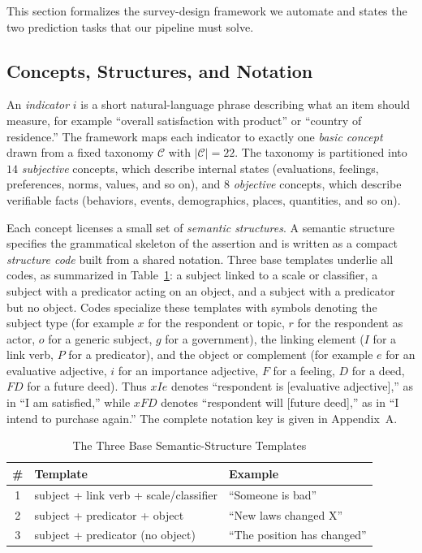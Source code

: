 \documentclass[onecolumn, 11pt]{IEEEtran}
\begin{document}
This section formalizes the survey-design framework we automate and states the two prediction tasks that our pipeline must solve.

\subsection{Concepts, Structures, and Notation}
An \emph{indicator} $i$ is a short natural-language phrase describing what an item should measure, for example ``overall satisfaction with product'' or ``country of residence.'' The framework maps each indicator to exactly one \emph{basic concept} drawn from a fixed taxonomy $\mathcal{C}$ with $|\mathcal{C}| = 22$. The taxonomy is partitioned into $14$ \emph{subjective} concepts, which describe internal states (evaluations, feelings, preferences, norms, values, and so on), and $8$ \emph{objective} concepts, which describe verifiable facts (behaviors, events, demographics, places, quantities, and so on).

Each concept licenses a small set of \emph{semantic structures}. A semantic structure specifies the grammatical skeleton of the assertion and is written as a compact \emph{structure code} built from a shared notation. Three base templates underlie all codes, as summarized in Table~\ref{tab:structures}: a subject linked to a scale or classifier, a subject with a predicator acting on an object, and a subject with a predicator but no object. Codes specialize these templates with symbols denoting the subject type (for example $x$ for the respondent or topic, $r$ for the respondent as actor, $o$ for a generic subject, $g$ for a government), the linking element ($I$ for a link verb, $P$ for a predicator), and the object or complement (for example $e$ for an evaluative adjective, $i$ for an importance adjective, $F$ for a feeling, $D$ for a deed, $FD$ for a future deed). Thus $xIe$ denotes ``respondent is [evaluative adjective],'' as in ``I am satisfied,'' while $xFD$ denotes ``respondent will [future deed],'' as in ``I intend to purchase again.'' The complete notation key is given in Appendix~A.

\begin{table}[t]
\caption{The Three Base Semantic-Structure Templates}
\label{tab:structures}
\centering
\footnotesize
\begin{tabular}{c l l}
\hline
\textbf{\#} & \textbf{Template} & \textbf{Example} \\
\hline
1 & subject + link verb + scale/classifier & ``Someone is bad'' \\
2 & subject + predicator + object & ``New laws changed X'' \\
3 & subject + predicator (no object) & ``The position has changed'' \\
\hline
\end{tabular}
\end{table}
\end{document}
